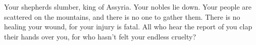  Your shepherds slumber, king of Assyria. Your nobles lie
down. Your people are scattered on the mountains, and there is no one to
gather them.  There is no healing your wound, for your
injury is fatal. All who hear the report of you clap their hands over
you, for who hasn't felt your endless cruelty?
